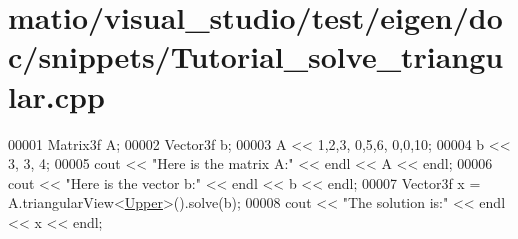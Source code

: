 \hypertarget{matio_2visual__studio_2test_2eigen_2doc_2snippets_2_tutorial__solve__triangular_8cpp_source}{}\section{matio/visual\+\_\+studio/test/eigen/doc/snippets/\+Tutorial\+\_\+solve\+\_\+triangular.cpp}
\label{matio_2visual__studio_2test_2eigen_2doc_2snippets_2_tutorial__solve__triangular_8cpp_source}

\begin{DoxyCode}
00001 Matrix3f A;
00002 Vector3f b;
00003 A << 1,2,3,  0,5,6,  0,0,10;
00004 b << 3, 3, 4;
00005 cout << \textcolor{stringliteral}{"Here is the matrix A:"} << endl << A << endl;
00006 cout << \textcolor{stringliteral}{"Here is the vector b:"} << endl << b << endl;
00007 Vector3f x = A.triangularView<\hyperlink{group__enums_gga39e3366ff5554d731e7dc8bb642f83cda6bcb58be3b8b8ec84859ce0c5ac0aaec}{Upper}>().solve(b);
00008 cout << \textcolor{stringliteral}{"The solution is:"} << endl << x << endl;
\end{DoxyCode}
